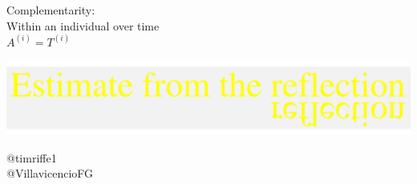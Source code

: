 \documentclass[20pt]{beamer}
\begin{document}
\begin{frame}[plain]
\Large
\begin{center}
Complementarity:\\ \vspace{1em}
Within an individual over time\\  \vspace{.5em} \huge
$A^{(i)} = T^{(i)}$
\end{center}
\end{frame}

\begin{frame}
\Large
\vspace{1em}
\begin{center}
\includegraphics[scale=.8]{Figures/ReflectionOverlay.pdf}
\end{center}

\vspace{4em}
\begin{flushright}
@timriffe1 \\
@VillavicencioFG
\end{flushright}

\end{frame}

\end{document}
